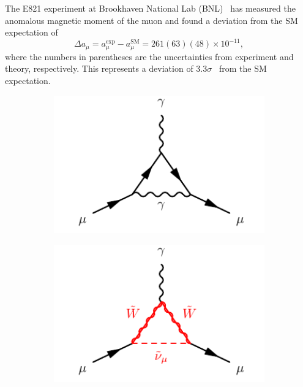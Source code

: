 The E821 experiment at Brookhaven National Lab (BNL)~\cite{Bennett:2006fi} has measured the anomalous magnetic moment of the muon and found a deviation from the SM expectation of
\begin{equation}
	\Delta a_\mu = a^\mathrm{exp}_\mu - a^\mathrm{SM}_\mu = 261(63)(48)\times 10^{-11},
\end{equation}
where the numbers in parentheses are the uncertainties from experiment and theory, respectively. This represents a deviation of $3.3\sigma$~\cite{pdg2020} from the SM expectation. 

\begin{figure}
	\centering
	\begin{subfigure}[b]{0.33\linewidth}
		\centering\includegraphics[width=1.0\textwidth]{qed_anomalous_moment}
		\caption{\label{fig:qed_anomalous_moment}}
	\end{subfigure}%
	\begin{subfigure}[b]{0.33\linewidth}
		\centering\includegraphics[width=1.0\textwidth]{susy_anomalous_moment_1}

\end{subfigure}
\end{figure}

